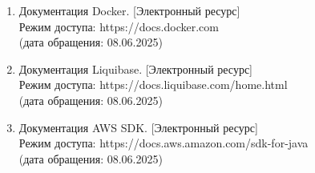 \documentclass[14pt]{extarticle}
\begin{document}
\begin{enumerate}
    \item Документация Docker. [Электронный ресурс]\\
    Режим доступа: https://docs.docker.com\\
    (дата обращения: 08.06.2025)

    \item Документация Liquibase. [Электронный ресурс]\\
    Режим доступа: https://docs.liquibase.com/home.html\\
    (дата обращения: 08.06.2025)

    \item Документация AWS SDK. [Электронный ресурс]\\
    Режим доступа: https://docs.aws.amazon.com/sdk-for-java\\
    (дата обращения: 08.06.2025)
\end{enumerate}
\end{document}
